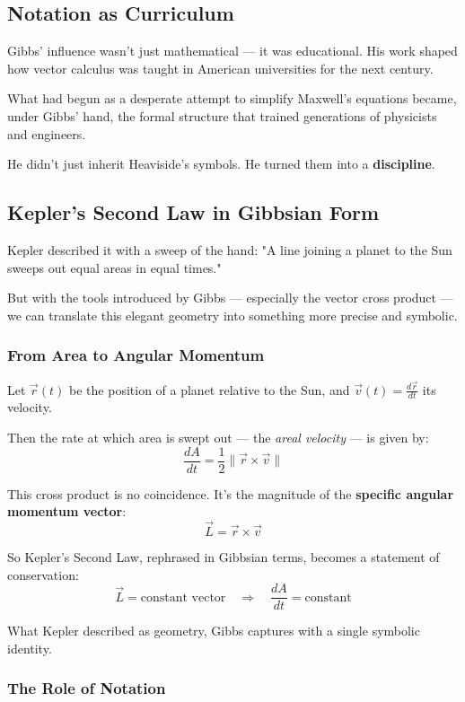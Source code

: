 \subsection{Notation as Curriculum}

Gibbs’ influence wasn’t just mathematical — it was educational.  
His work shaped how vector calculus was taught in American universities for the next century.

What had begun as a desperate attempt to simplify Maxwell’s equations became, under Gibbs’ hand, the formal structure that trained generations of physicists and engineers.

He didn’t just inherit Heaviside’s symbols.  
He turned them into a \textbf{discipline}.

\subsection{Kepler’s Second Law in Gibbsian Form}

Kepler described it with a sweep of the hand:  
"A line joining a planet to the Sun sweeps out equal areas in equal times."

But with the tools introduced by Gibbs — especially the vector cross product — we can translate this elegant geometry into something more precise and symbolic.

\subsubsection{From Area to Angular Momentum}

Let \( \vec{r}(t) \) be the position of a planet relative to the Sun, and \( \vec{v}(t) = \frac{d\vec{r}}{dt} \) its velocity.

Then the rate at which area is swept out — the \textit{areal velocity} — is given by:
\[
\frac{dA}{dt} = \frac{1}{2} \|\vec{r} \times \vec{v}\|
\]

This cross product is no coincidence. It’s the magnitude of the \textbf{specific angular momentum vector}:
\[
\vec{L} = \vec{r} \times \vec{v}
\]

So Kepler’s Second Law, rephrased in Gibbsian terms, becomes a statement of conservation:
\[
\vec{L} = \text{constant vector} \quad \Rightarrow \quad \frac{dA}{dt} = \text{constant}
\]

What Kepler described as geometry, Gibbs captures with a single symbolic identity.

\subsubsection{The Role of Notation}

